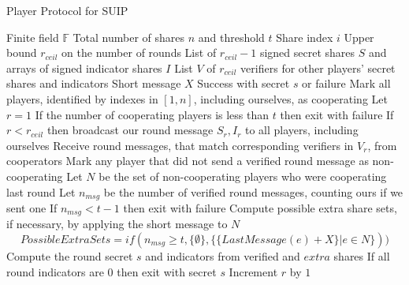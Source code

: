 \documentclass{dalcsthesis}
\begin{document}
\begin{algorithm}
  \caption{Player Protocol for SUIP}
  \label{alg:SUIP:Player}
  \begin{algorithmic}
    \INPUT Finite field $\mathbb{F}$
    \INPUT Total number of shares $n$ and threshold $t$
    \INPUT Share index $i$
    \INPUT Upper bound $r_{ceil}$ on the number of rounds
    \INPUT List of $r_{ceil}-1$ signed secret shares $S$ and arrays of signed indicator shares $I$
    \INPUT List $V$ of $r_{ceil}$ verifiers for other players' secret shares and indicators
    \INPUT Short message $X$
    \OUTPUT Success with secret $s$ or failure
    \STATE Mark all players, identified by indexes in $[1, n]$, including ourselves, as cooperating
    \STATE Let $r = 1$
      \STATE If the number of cooperating players is less than $t$ then exit with failure
      \STATE If $r < r_{ceil}$ then broadcast our round message $S_r, I_r$ to all players, including ourselves
      \STATE Receive round messages, that match corresponding verifiers in $V_r$, from cooperators
      \STATE Mark any player that did not send a verified round message as non-cooperating
      \STATE Let $N$ be the set of non-cooperating players who were cooperating last round
      \STATE Let $n_{msg}$ be the number of verified round messages, counting ours if we sent one
      \STATE If $n_{msg} < t - 1$ then exit with failure
      \STATE Compute possible extra share sets, if necessary, by applying the short message to $N$
      		$$PossibleExtraSets = if(n_{msg} \geq t, \{\emptyset\}, \{\{LastMessage(e) + X\} | e \in N\}))$$
        \STATE Compute the round secret $s$ and indicators from verified and $extra$ shares
        \STATE If all round indicators are 0 then exit with secret $s$
      \ENDFOR
      \STATE Increment $r$ by $1$
    \ENDWHILE
  \end{algorithmic}
\end{algorithm}
\end{document}
